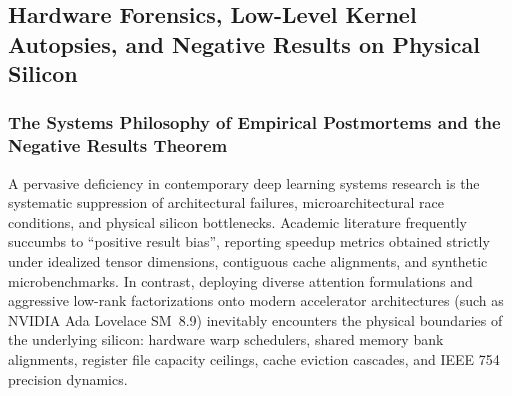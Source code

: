 \subsection{Hardware Forensics, Low-Level Kernel Autopsies, and Negative Results on Physical Silicon}
\label{sec:ablations_hardware_autopsies}

\subsubsection{The Systems Philosophy of Empirical Postmortems and the Negative Results Theorem}
\label{sec:ablations_forensics_philosophy}

A pervasive deficiency in contemporary deep learning systems research is the systematic suppression of architectural failures, microarchitectural race conditions, and physical silicon bottlenecks. Academic literature frequently succumbs to ``positive result bias'', reporting speedup metrics obtained strictly under idealized tensor dimensions, contiguous cache alignments, and synthetic microbenchmarks. In contrast, deploying diverse attention formulations and aggressive low-rank factorizations onto modern accelerator architectures (such as NVIDIA Ada Lovelace SM~8.9) inevitably encounters the physical boundaries of the underlying silicon: hardware warp schedulers, shared memory bank alignments, register file capacity ceilings, cache eviction cascades, and IEEE 754 precision dynamics.

